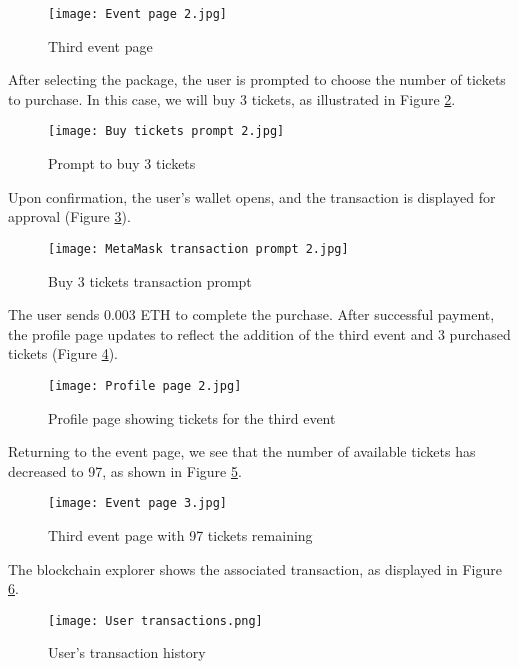 \begin{figure}[H]
    \texttt{[image: Event page 2.jpg]}
    \centering
    \caption{Third event page}
    \label{fig:buy_tickets_event}
\end{figure}

After selecting the package, the user is prompted to choose the number of
tickets to purchase. In this case, we will buy 3 tickets, as illustrated in
Figure \ref{fig:buy_tickets_prompt}.

\begin{figure}[H]
    \texttt{[image: Buy tickets prompt 2.jpg]}
    \centering
    \caption{Prompt to buy 3 tickets}
    \label{fig:buy_tickets_prompt}
\end{figure}

Upon confirmation, the user's wallet opens, and the transaction is displayed
for approval (Figure \ref{fig:buy_tickets_transaction}).

\begin{figure}[H]
    \texttt{[image: MetaMask transaction prompt 2.jpg]}
    \centering
    \caption{Buy 3 tickets transaction prompt}
    \label{fig:buy_tickets_transaction}
\end{figure}

The user sends 0.003 ETH to complete the purchase. After successful payment,
the profile page updates to reflect the addition of the third event and 3
purchased tickets (Figure \ref{fig:profile_page_2}).

\begin{figure}[H]
    \texttt{[image: Profile page 2.jpg]}
    \centering
    \caption{Profile page showing tickets for the third event}
    \label{fig:profile_page_2}
\end{figure}

Returning to the event page, we see that the number of available tickets has
decreased to 97, as shown in Figure \ref{fig:buy_tickets_event_2}.

\begin{figure}[H]
    \texttt{[image: Event page 3.jpg]}
    \centering
    \caption{Third event page with 97 tickets remaining}
    \label{fig:buy_tickets_event_2}
\end{figure}

The blockchain explorer shows the associated transaction, as displayed in
Figure \ref{fig:user_transactions}.

\begin{figure}[H]
    \texttt{[image: User transactions.png]}
    \centering
    \caption{User's transaction history}
    \label{fig:user_transactions}
\end{figure}

